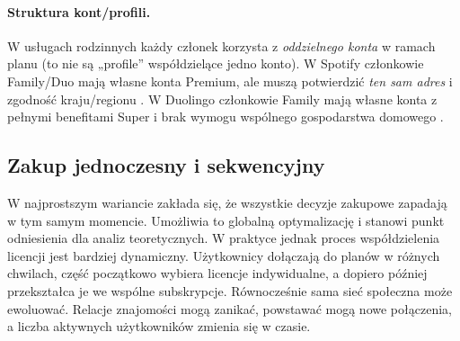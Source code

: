 \paragraph{Struktura kont/profili.} W usługach rodzinnych każdy członek korzysta z \emph{oddzielnego konta} w ramach planu (to nie są „profile” współdzielące jedno konto). W Spotify członkowie Family/Duo mają własne konta Premium, ale muszą potwierdzić \emph{ten sam adres} i zgodność kraju/regionu \cite{spotify_family_address_verification}. W Duolingo członkowie Family mają własne konta z pełnymi benefitami Super i brak wymogu wspólnego gospodarstwa domowego \cite{duolingo_family_blog}.






\subsection{Zakup jednoczesny i sekwencyjny}

W najprostszym wariancie zakłada się, że wszystkie decyzje zakupowe zapadają w tym samym momencie. Umożliwia to globalną optymalizację i stanowi punkt odniesienia dla analiz teoretycznych. W praktyce jednak proces współdzielenia licencji jest bardziej dynamiczny. Użytkownicy dołączają do planów w różnych chwilach, część początkowo wybiera licencje indywidualne, a dopiero później przekształca je we wspólne subskrypcje. Równocześnie sama sieć społeczna może ewoluować. Relacje znajomości mogą zanikać, powstawać mogą nowe połączenia, a liczba aktywnych użytkowników zmienia się w czasie.

